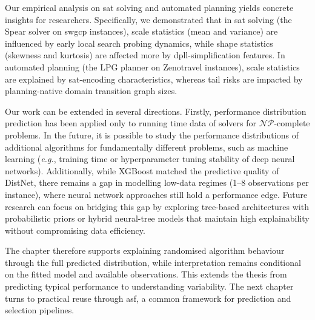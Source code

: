 Our empirical analysis on \gls{sat} solving and automated planning yields concrete insights for researchers. Specifically, we demonstrated that in \gls{sat} solving (the Spear solver on \gls{swgcp} instances), scale statistics (mean and variance) are influenced by early local search probing dynamics, while shape statistics (skewness and kurtosis) are affected more by \gls{dpll}-simplification features.
In automated planning (the LPG planner on Zenotravel instances), scale statistics are explained by \gls{sat}-encoding characteristics, whereas tail risks are impacted by planning-native domain transition graph sizes.

Our work can be extended in several directions. Firstly, performance distribution prediction has been applied only to running time data of solvers for $\mathcal{NP}$-complete problems. In the future, it is possible to study the performance distributions of additional algorithms for fundamentally different problems, such as machine learning (\emph{e.g.}, training time or hyperparameter tuning stability of deep neural networks). Additionally, while XGBoost matched the predictive quality of DistNet, there remains a gap in modelling low-data regimes (1–8 observations per instance), where neural network approaches still hold a performance edge. Future research can focus on bridging this gap by exploring tree-based architectures with probabilistic priors or hybrid neural-tree models that maintain high explainability without compromising data efficiency.

The chapter therefore supports explaining randomised algorithm behaviour through the full predicted distribution, while interpretation remains conditional on the fitted model and available observations. This extends the thesis from predicting typical performance to understanding variability. The next chapter turns to practical reuse through \gls{asf}, a common framework for prediction and selection pipelines.
